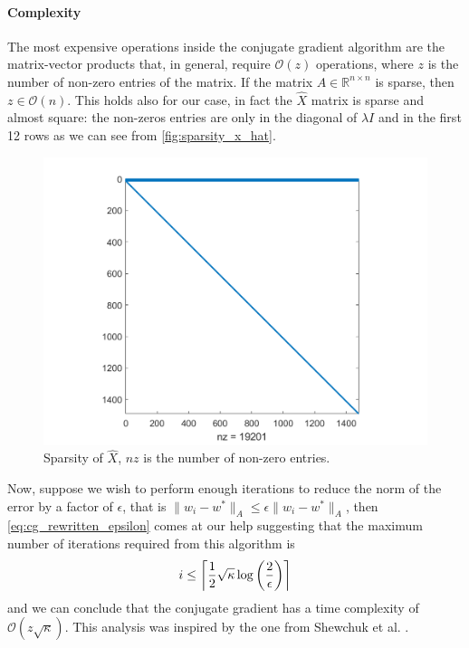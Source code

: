 \paragraph{Complexity}
The most expensive operations inside the conjugate gradient algorithm are the matrix-vector products that, in general, require $\mathcal{O}(z)$ operations, where $z$ is the number of non-zero entries of the matrix. If the matrix $A \in \mathbb{R}^{n \times n}$ is sparse, then $z \in \mathcal{O}(n)$. This holds also for our case, in fact the $\hat{X}$ matrix is sparse and almost square: the non-zeros entries are only in the diagonal of $\lambda I$ and in the first 12 rows as we can see from \autoref{fig:sparsity_x_hat}.
\begin{figure}[H]
    \centering
    \includegraphics[width = 0.8\linewidth]{images/cg/spy_Xhat.png}
    \caption{Sparsity of $\hat{X}$, $nz$ is the number of non-zero entries.}
    \label{fig:sparsity_x_hat}
\end{figure}

\noindent Now, suppose we wish to perform enough iterations to reduce the norm of the error by a factor of $\epsilon$, that is $\lVert w_{i}-w^*\rVert_A \leq \epsilon \lVert w_{i}-w^*\rVert_A $, then \eqref{eq:cg_rewritten_epsilon} comes at our help suggesting that the maximum number of iterations required from this algorithm is
\begin{equation}
    i \leq \ceil*{\frac{1}{2} \sqrt{\kappa} \log{\left(\frac{2}{\epsilon}\right)}}
    \label{eq:cg_maximum_iterations}
\end{equation}
and we can conclude that the conjugate gradient has a time complexity of $\mathcal{O}(z\sqrt{\kappa})$. This analysis was inspired by the one from Shewchuk et al. \cite{shewchuk1994introduction}.

